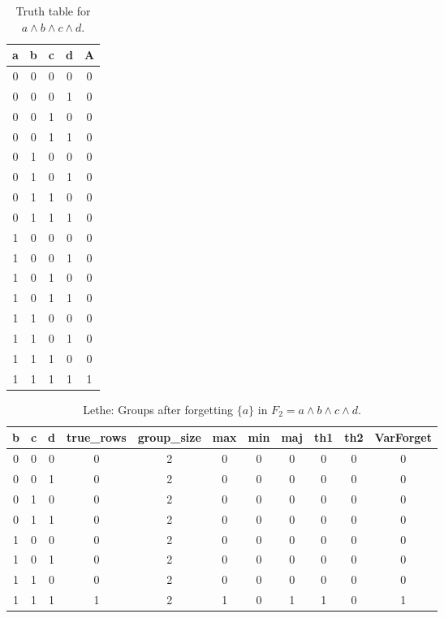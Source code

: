 \begin{table}[!tb]
    \centering
    \begin{tabular}{|c|c|c|c|c|}
        \hline
        \textbf{a} & \textbf{b} & \textbf{c} & \textbf{d} & \textbf{A} \\ \hline
        0 & 0 & 0 & 0 & 0 \\ \hline
        0 & 0 & 0 & 1 & 0 \\ \hline
        0 & 0 & 1 & 0 & 0 \\ \hline
        0 & 0 & 1 & 1 & 0 \\ \hline
        0 & 1 & 0 & 0 & 0 \\ \hline
        0 & 1 & 0 & 1 & 0 \\ \hline
        0 & 1 & 1 & 0 & 0 \\ \hline
        0 & 1 & 1 & 1 & 0 \\ \hline
        1 & 0 & 0 & 0 & 0 \\ \hline
        1 & 0 & 0 & 1 & 0 \\ \hline
        1 & 0 & 1 & 0 & 0 \\ \hline
        1 & 0 & 1 & 1 & 0 \\ \hline
        1 & 1 & 0 & 0 & 0 \\ \hline
        1 & 1 & 0 & 1 & 0 \\ \hline
        1 & 1 & 1 & 0 & 0 \\ \hline
        1 & 1 & 1 & 1 & 1 \\ \hline
    \end{tabular}
    \caption{Truth table for $a \land b \land c \land d$.}
    \label{tab:truthtab}
\end{table}

\begin{table}[!tb]
    \centering
    \begin{tabular}{|c|c|c|c|c|c|c|c|c|c|c|}
        \hline
        \textbf{b} & \textbf{c} & \textbf{d} & \textbf{true\_rows} & \textbf{group\_size} & \textbf{max} & \textbf{min} & \textbf{maj} & \textbf{th1} & \textbf{th2} & \textbf{VarForget} \\ \hline
        \rowcolor{gray!40} 0 & 0 & 0 & 0 & 2 & 0 & 0 & 0 & 0 & 0 & 0 \\ \hline
        \rowcolor{blue!40} 0 & 0 & 1 & 0 & 2 & 0 & 0 & 0 & 0 & 0 & 0 \\ \hline
        \rowcolor{red!40} 0 & 1 & 0 & 0 & 2 & 0 & 0 & 0 & 0 & 0 & 0 \\ \hline
        \rowcolor{green!40} 0 & 1 & 1 & 0 & 2 & 0 & 0 & 0 & 0 & 0 & 0 \\ \hline
        \rowcolor{yellow!40} 1 & 0 & 0 & 0 & 2 & 0 & 0 & 0 & 0 & 0 & 0 \\ \hline
        \rowcolor{gray!40} 1 & 0 & 1 & 0 & 2 & 0 & 0 & 0 & 0 & 0 & 0 \\ \hline
        \rowcolor{blue!40} 1 & 1 & 0 & 0 & 2 & 0 & 0 & 0 & 0 & 0 & 0 \\ \hline
        \rowcolor{red!40} 1 & 1 & 1 & 1 & 2 & 1 & 0 & 1 & 1 & 0 & 1 \\ \hline
    \end{tabular}
    \caption{Lethe: Groups after forgetting $\{a\}$ in $F_{2} = a \land b \land c \land d$.}
    \label{tab:lethe-F2-a-groups}
\end{table}
